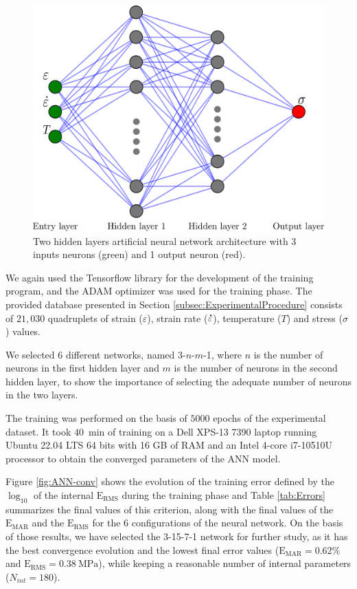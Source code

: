 \documentclass[metals,article,submit,pdftex,moreauthors]{Definitions/mdpi}
\DeclareRobustCommand{\mdot}[1]{\accentset{\mbox{\bfseries .}}{#1}}
\DeclareRobustCommand{\RMSE}{\text{E}_\text{RMS}}
\DeclareRobustCommand{\MARE}{\text{E}_\text{MAR}}
\DeclareRobustCommand{\MPa}{\text{MPa}}
\begin{document}
\begin{figure}[H]
\centering
\includegraphics[width=0.55\columnwidth]{Figures/ANN-scheme-2HL}
\caption{Two hidden layers artificial neural network architecture with 3 inputs neurons (green) and 1 output neuron (red).}
\label{fig:ANN-2HL}
\end{figure}

We again used the Tensorflow library for the development of the training program, and the ADAM optimizer was used for the training phase.
The provided database presented in Section \ref{subsec:ExperimentalProcedure} consists of $21,030$ quadruplets of strain ($\varepsilon$), strain rate ($\mdot\varepsilon$), temperature ($T$) and stress ($\sigma$) values.

We selected 6 different networks, named 3-$n$-$m$-1, where $n$ is the number of neurons in the first hidden layer and $m$ is the number of neurons in the second hidden layer, to show the importance of selecting the adequate number of neurons in the two layers.

The training was performed on the basis of $5000$ epochs of the experimental dataset.
It took $40$~min of training on a Dell XPS-13 7390 laptop running Ubuntu 22.04 LTS 64 bits with 16 GB of RAM and an Intel 4-core i7-10510U processor to obtain the converged parameters of the ANN model.

Figure \ref{fig:ANN-conv} shows the evolution of the training error defined by the $\log_{10}$ of the internal $\RMSE$ during the training phase and Table \ref{tab:Errors} summarizes the final values of this criterion, along with the final values of the $\MARE$ and the $\RMSE$ for the 6 configurations of the neural network.
On the basis of those results, we have selected the 3-15-7-1 network for further study, as it has the best convergence evolution and the lowest final error values ($\MARE=0.62\%$ and $\RMSE=0.38~\MPa$), while keeping a reasonable number of internal parameters ($N_{int}=180$).
\end{document}

